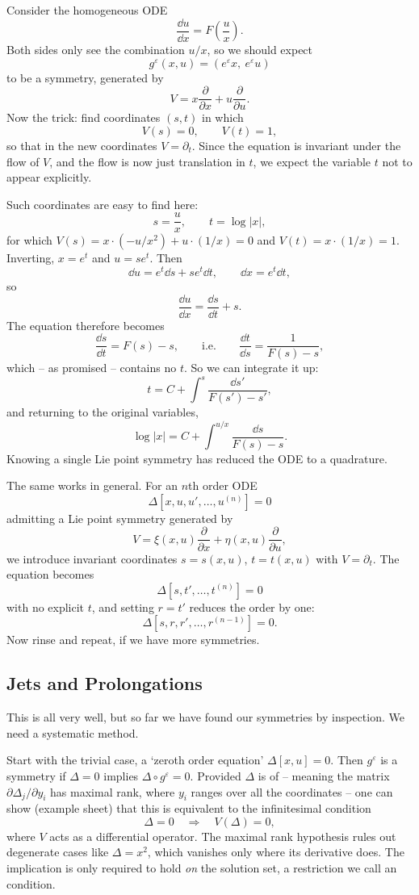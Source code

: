 \begin{example}
	Consider the homogeneous ODE
	$$
	\frac{\dd u}{\dd x} = F\left(\frac{u}{x}\right).
	$$
	Both sides only see the combination $u/x$, so we should expect
	$$
	g^\varepsilon(x,u) = \left(e^\varepsilon x,\ e^\varepsilon u\right)
	$$
	to be a symmetry, generated by
	$$
	V = x\frac{\partial}{\partial x} + u\frac{\partial}{\partial u}.
	$$
	Now the trick: find coordinates $(s,t)$ in which
	$$
	V(s) = 0, \qquad V(t) = 1,
	$$
	so that in the new coordinates $V = \partial_t$. Since the equation is invariant under the flow of $V$, and the flow is now just translation in $t$, we expect the variable $t$ not to appear explicitly.

	Such coordinates are easy to find here:
	$$
	s = \frac{u}{x}, \qquad t = \log|x|,
	$$
	for which $V(s) = x\cdot(-u/x^2) + u\cdot(1/x) = 0$ and $V(t) = x\cdot(1/x) = 1$. Inverting, $x = e^t$ and $u = se^t$. Then
	$$
	\dd u = e^t\dd s + se^t\dd t, \qquad \dd x = e^t\dd t,
	$$
	so
	$$
	\frac{\dd u}{\dd x} = \frac{\dd s}{\dd t} + s.
	$$
	The equation therefore becomes
	$$
	\frac{\dd s}{\dd t} = F(s) - s, \qquad\text{i.e.}\qquad \frac{\dd t}{\dd s} = \frac{1}{F(s)-s},
	$$
	which -- as promised -- contains no $t$. So we can integrate it up:
	$$
	t = C + \int^s\frac{\dd s'}{F(s')-s'},
	$$
	and returning to the original variables,
	$$
	\log|x| = C + \int^{u/x}\frac{\dd s}{F(s)-s}.
	$$
	Knowing a single Lie point symmetry has reduced the ODE to a quadrature.
\end{example}

The same works in general. For an $n$th order ODE
$$
\Delta\left[x,u,u',\dots,u^{(n)}\right] = 0
$$
admitting a Lie point symmetry generated by
$$
V = \xi(x,u)\frac{\partial}{\partial x} + \eta(x,u)\frac{\partial}{\partial u},
$$
we introduce invariant coordinates $s = s(x,u)$, $t = t(x,u)$ with $V = \partial_t$. The equation becomes
$$
\Delta\left[s, t', \dots, t^{(n)}\right] = 0
$$
with no explicit $t$, and setting $r = t'$ reduces the order by one:
$$
\Delta\left[s,r,r',\dots,r^{(n-1)}\right] = 0.
$$
Now rinse and repeat, if we have more symmetries.

\subsection{Jets and Prolongations}

This is all very well, but so far we have found our symmetries by inspection. We need a systematic method.

Start with the trivial case, a `zeroth order equation' $\Delta[x,u] = 0$. Then $g^\varepsilon$ is a symmetry if $\Delta = 0$ implies $\Delta\circ g^\varepsilon = 0$. Provided $\Delta$ is of  -- meaning the matrix $\partial\Delta_j/\partial y_i$ has maximal rank, where $y_i$ ranges over all the coordinates -- one can show (example sheet) that this is equivalent to the infinitesimal condition
$$
\Delta = 0 \quad\Longrightarrow\quad V(\Delta) = 0,
$$
where $V$ acts as a differential operator. The maximal rank hypothesis rules out degenerate cases like $\Delta = x^2$, which vanishes only where its derivative does. The implication is only required to hold \emph{on} the solution set, a restriction we call an  condition.

